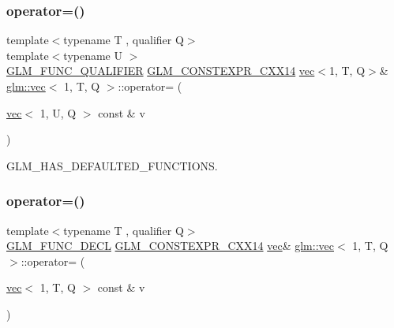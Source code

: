 \subsubsection{\texorpdfstring{operator=()}{operator=()}\hspace{0.1cm}{\footnotesize\ttfamily [1/3]}}
{\footnotesize\ttfamily template$<$typename T , qualifier Q$>$ \\
template$<$typename U $>$ \\
\mbox{\hyperlink{setup_8hpp_a33fdea6f91c5f834105f7415e2a64407}{G\+L\+M\+\_\+\+F\+U\+N\+C\+\_\+\+Q\+U\+A\+L\+I\+F\+I\+ER}} \mbox{\hyperlink{setup_8hpp_a4dd12abf5e1164bc57f3a34671d03844}{G\+L\+M\+\_\+\+C\+O\+N\+S\+T\+E\+X\+P\+R\+\_\+\+C\+X\+X14}} \mbox{\hyperlink{structglm_1_1vec}{vec}}$<$1, T, Q$>$\& \mbox{\hyperlink{structglm_1_1vec}{glm\+::vec}}$<$ 1, T, Q $>$\+::operator= (\begin{DoxyParamCaption}\item[{\mbox{\hyperlink{structglm_1_1vec}{vec}}$<$ 1, U, Q $>$ const \&}]{v }\end{DoxyParamCaption})}



G\+L\+M\+\_\+\+H\+A\+S\+\_\+\+D\+E\+F\+A\+U\+L\+T\+E\+D\+\_\+\+F\+U\+N\+C\+T\+I\+O\+NS. 

\mbox{\label{structglm_1_1vec_3_011_00_01_t_00_01_q_01_4_ac0ab0e9e96caa507674d12526367ea11}} 
\subsubsection{\texorpdfstring{operator=()}{operator=()}\hspace{0.1cm}{\footnotesize\ttfamily [2/3]}}
{\footnotesize\ttfamily template$<$typename T , qualifier Q$>$ \\
\mbox{\hyperlink{setup_8hpp_ab2d052de21a70539923e9bcbf6e83a51}{G\+L\+M\+\_\+\+F\+U\+N\+C\+\_\+\+D\+E\+CL}} \mbox{\hyperlink{setup_8hpp_a4dd12abf5e1164bc57f3a34671d03844}{G\+L\+M\+\_\+\+C\+O\+N\+S\+T\+E\+X\+P\+R\+\_\+\+C\+X\+X14}} \mbox{\hyperlink{structglm_1_1vec}{vec}}\& \mbox{\hyperlink{structglm_1_1vec}{glm\+::vec}}$<$ 1, T, Q $>$\+::operator= (\begin{DoxyParamCaption}\item[{\mbox{\hyperlink{structglm_1_1vec}{vec}}$<$ 1, T, Q $>$ const \&}]{v }\end{DoxyParamCaption})}

